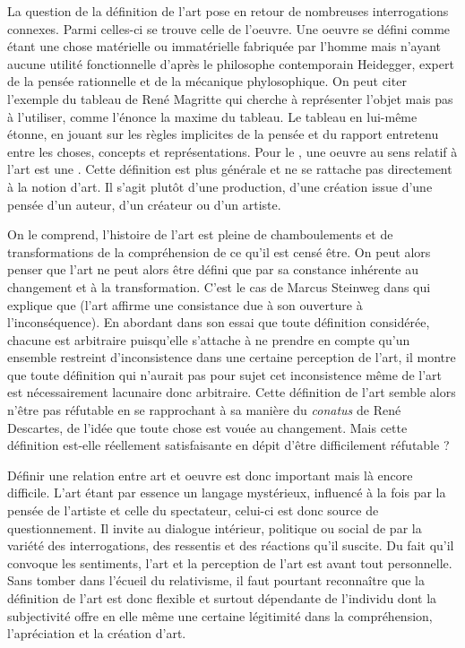 \documentclass[12pt]{article} %
\begin{document}
La question de la définition de l'art pose en retour de nombreuses interrogations connexes. Parmi celles-ci se trouve celle de l'oeuvre. Une oeuvre se défini comme étant une chose matérielle ou immatérielle fabriquée par l'homme mais n'ayant aucune utilité fonctionnelle d'après le philosophe contemporain Heidegger, expert de la pensée rationnelle et de la mécanique phylosophique. On peut citer l'exemple du tableau de René Magritte  qui cherche à représenter l'objet mais pas à l'utiliser, comme l'énonce la maxime  du tableau\cite{RMAgritte1929}. Le tableau en lui-même étonne, en jouant sur les règles implicites de la pensée et du rapport entretenu entre les choses, concepts et représentations. Pour le , une oeuvre au sens relatif à l'art est une  \cite{LarousseOnline-oeuvre}. Cette définition est plus générale et ne se rattache pas directement à la notion d'art. Il s'agit plutôt d'une production, d'une création issue d'une pensée d'un auteur, d'un créateur ou d'un artiste.  

On le comprend, l'histoire de l'art est pleine de chamboulements et de transformations de la compréhension de ce qu'il est censé être. On peut alors penser que l'art ne peut alors être défini que par sa constance inhérente au changement et à la transformation. C'est le cas de Marcus Steinweg dans  qui explique que  (l'art affirme une consistance due à son ouverture à l'inconséquence). En abordant dans son essai que toute définition considérée, chacune est arbitraire puisqu'elle s'attache à ne prendre en compte qu'un ensemble restreint d'inconsistence dans une certaine perception de l'art, il montre que toute définition qui n'aurait pas pour sujet cet inconsistence même de l'art est nécessairement lacunaire donc arbitraire. Cette définition de l'art semble alors n'être pas réfutable en se rapprochant à sa manière du \textit{conatus} de René Descartes, de l'idée que toute chose est vouée au changement. Mais cette définition est-elle réellement satisfaisante en dépit d'être difficilement réfutable ?

Définir une relation entre art et oeuvre est donc important mais là encore difficile.  L'art étant par essence un langage mystérieux, influencé à la fois par la pensée de l'artiste et celle du spectateur, celui-ci est donc source de questionnement. Il invite au dialogue intérieur, politique ou social de par la variété des interrogations, des ressentis et des réactions qu'il suscite. Du fait qu'il convoque les sentiments, l'art et la perception de l'art est avant tout personnelle. Sans tomber dans l'écueil du relativisme, il faut pourtant reconnaître que la définition de l'art est donc flexible et surtout dépendante de l'individu dont la subjectivité offre en elle même une certaine légitimité dans la compréhension, l'apréciation et la création d'art. 
\end{document}
